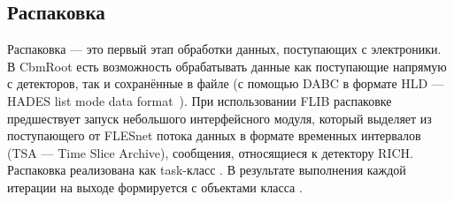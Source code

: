 

\subsection{Распаковка}

Распаковка --- это первый этап обработки данных, поступающих с электроники. В CbmRoot есть возможность обрабатывать данные как поступающие напрямую с детекторов, так и сохранённые в файле (с помощью DABC в формате HLD --- HADES list mode data format~\cite{HLD}). При использовании FLIB распаковке предшествует запуск небольшого интерфейсного модуля, который выделяет из поступающего от FLESnet потока данных в формате временных интервалов (TSA --- Time Slice Archive), сообщения, относящиеся к детектору RICH. Распаковка реализована как task-класс . В результате выполнения каждой итерации на выходе формируется  с объектами класса .

